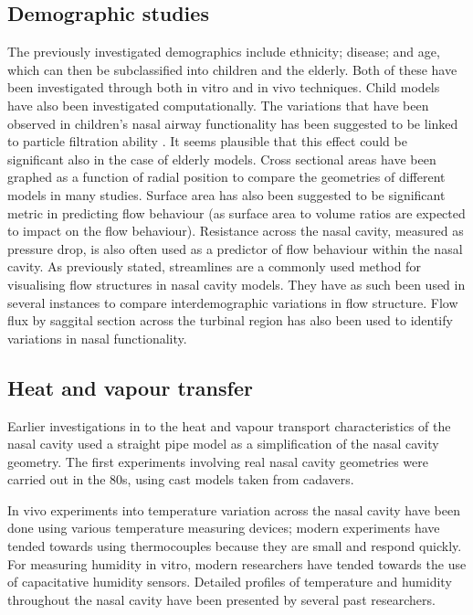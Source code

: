 \subsection{Demographic studies}
The previously investigated demographics include ethnicity\cite{Zhu2011}; disease\cite{Garcia2007}; and  age\cite{Xi2012}, which can then be subclassified into children\cite{Xi2012} and the elderly\cite{Lindemann2008}. Both of these have been investigated through both in vitro\cite{Weinhold2004} and in vivo\cite{Kalmovich2005, Edelstein1996, WhanKim2007, Lindemann2008} techniques. Child models have also been investigated computationally\cite{Xi2012}. The variations that have been observed in children's nasal airway functionality has been suggested to be linked to particle filtration ability \cite{Xi2012}. It seems plausible that this effect could be significant also in the case of elderly models. Cross sectional areas have been graphed as a function of radial position to compare the geometries of different models in many studies\cite{Xi2012, Zhu2011, Lindemann2008, Garcia2007}. Surface area has also been suggested to be significant metric in predicting flow behaviour (as surface area to volume ratios are expected to impact on the flow behaviour\cite{Xi2012, Garcia2007}). Resistance across the nasal cavity, measured as pressure drop, is also often used as a predictor of flow behaviour within the nasal cavity\cite{Edelstein1996, Lindemann2008, WhanKim2007}. As previously stated, streamlines are a commonly used method for visualising flow structures in nasal cavity models. They have as such been used in several instances to compare interdemographic variations in flow structure\cite{Xi2012, Garcia2007, Zhu2011}. Flow flux by saggital section across the turbinal region has also been used to identify variations in nasal functionality\cite{Zhu2011}. 


\subsection{Heat and vapour transfer}

Earlier investigations in to the heat and vapour transport characteristics of the nasal cavity used a straight pipe model as a simplification of the nasal cavity geometry\cite{Ingelstedt1961}. The first experiments involving real nasal cavity geometries were carried out in the 80s, using cast models taken from cadavers\cite{Nuckols1983}.

In vivo experiments into temperature variation across the nasal cavity have been done using various temperature measuring devices; modern experiments have tended towards using thermocouples because they are small and respond quickly\cite{Elad2008}. For measuring humidity in vitro, modern researchers have tended towards the use of capacitative humidity sensors\cite{Keck2000}. Detailed profiles of temperature and humidity throughout the nasal cavity have been presented by several past researchers\cite{Keck2000}.

